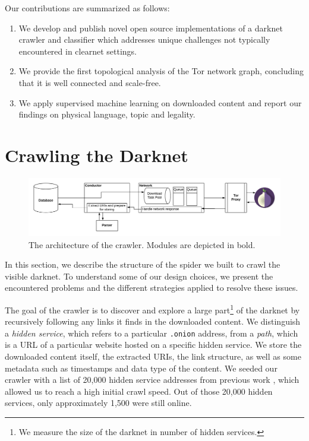 \documentclass[USenglish,oneside,twocolumn]{article}
\begin{document}
Our contributions are summarized as follows:

\begin{enumerate}
    \item We develop and publish novel open source implementations of a darknet crawler and classifier which addresses unique challenges not typically encountered in clearnet settings.
    \item We provide the first topological analysis of the Tor network graph, concluding that it is well connected and scale-free.
    \item We apply supervised machine learning on downloaded content and report our findings on physical language, topic and legality.
\end{enumerate}

\section{Crawling the Darknet}
\begin{figure}
\includegraphics[width=\linewidth]{images/ArchitecturalSchema.png}
\caption{The architecture of the crawler. Modules are depicted in bold.~\nocite{Loconte}}
\label{fig:scraperArchitecture}
\end{figure}
In this section, we describe the structure of the spider we built to crawl the visible darknet. To understand some of our design choices, we present the encountered problems and the different strategies applied to resolve these issues. 

The goal of the crawler is to discover and explore a large part\footnote{We measure the size of the darknet in number of hidden services.} of the darknet by recursively following any links it finds in the downloaded content. We distinguish a \emph{hidden service}, which refers to a particular \texttt{.onion} address, from a \emph{path}, which is a URL of a particular website hosted on a specific hidden service.  We store the downloaded content itself, the extracted URIs, the link structure, as well as some metadata such as timestamps and data type of the content.
We seeded our crawler with a list of 20,000 hidden service addresses from previous work \cite{Kadianakis2017}, which allowed us to reach a high initial crawl speed. Out of those 20,000 hidden services, only approximately 1,500 were still online. 
\end{document}
